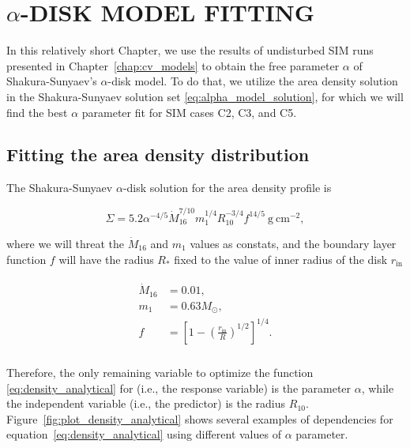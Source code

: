 \chapter{$\alpha$-DISK MODEL FITTING}
\label{chap:alpha_model_fitting}
\thispagestyle{empty}

In this relatively short Chapter, we use the results of undisturbed SIM runs presented in Chapter~\ref{chap:cv_models} to obtain the free parameter $\alpha$ of Shakura-Sunyaev's $\alpha$-disk model. To do that, we utilize the area density solution in the Shakura-Sunyaev solution set \eqref{eq:alpha_model_solution}, for which we will find the best $\alpha$ parameter fit for SIM cases C2, C3, and C5.

\section{Fitting the area density distribution}
    The Shakura-Sunyaev $\alpha$-disk solution for the area density profile is

    \begin{equation}
        \Sigma = 5.2 \alpha^{-4/5} \dot{M}^{7/10}_{16} m^{1/4}_1 R^{-3/4}_{10} f^{14/5}\ \si{\gram\ \cm^{-2}},
        \label{eq:density_analytical}
    \end{equation}

    where we will threat the $\dot{M}_{16}$ and $m_1$ values as constats, and the boundary layer function $f$ will have the radius $R_*$ fixed to the value of inner radius of the disk $r_{\mathrm{in}}$

    \begin{align}
        \begin{split}
            \dot{M}_{16} &= 0.01, \\
            m_1 &= 0.63 M_{\odot}, \\
            f &= \left[ 1 - \left( \frac{r_{\mathrm{in}}}{R} \right)^{1/2} \right]^{1/4}. \\
        \end{split}
    \end{align}

    Therefore, the only remaining variable to optimize the function \eqref{eq:density_analytical} for (i.e., the response variable) is the parameter $\alpha$, while the independent variable (i.e., the predictor) is the radius $R_{10}$. Figure~\ref{fig:plot_density_analytical} shows several examples of dependencies for equation~\eqref{eq:density_analytical} using different values of $\alpha$ parameter.  
    

